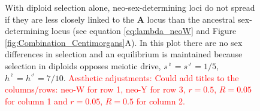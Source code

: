 \documentclass[12pt]{article}
\begin{document}
\begin{figure}[!h]
{With diploid selection alone, neo-sex-determining loci do not spread if they are less closely linked to the \textbf{A} locus than the ancestral sex-determining locus (see equation \eqref{eq:lambda_neoW} and Figure \ref{fig:Combination_Centimorgans}A). 
In this plot there are no sex differences in selection and an equilibrium is maintained because selection in diploids opposes meiotic drive, $s^\female =s^\male = 1/5$, $h^\female = h^\male = 7/10$.
\textcolor{red}{Aesthetic adjustments: 
Could add titles to the columns/rows: neo-W for row 1, neo-Y for row 3, $r=0.5$, $R=0.05$ for column 1 and $r=0.05$, $R=0.5$ for column 2. 
}
}
\label{fig:Combination_Turnover}
\end{figure}
\newpage
\end{document}
